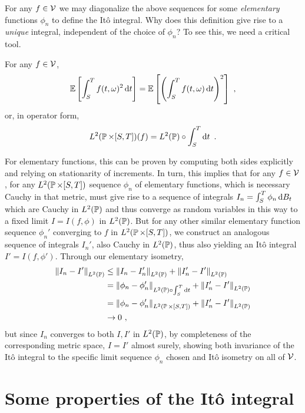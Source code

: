 \documentclass{article}
\begin{document}
For any \(f\in\mcV\) we may diagonalize the above sequences for some {\em elementary} functions \(\phi_n\) to define the It\^{o} integral. Why does this definition give rise to a {\em unique} integral, independent of the choice of \(\phi_n\)? To see this, we need a critical tool.

\begin{lemma}[It\^{o} Isometry]
  For any \(f\in \mcV\),
  \[
    \E\ha{\int_S^Tf(t, \omega)^2\d{t}}
    = \E\ha{\pa{\int_S^Tf(t, \omega)\d{t}}^2}\,\,,
  \]
  or, in operator form,
  \[L^2(\P \times [S, T])(f)=L^2(\P)\circ \int_S^T\d{t}\,\,.\]
\end{lemma}

For elementary functions, this can be proven by computing both sides explicitly and relying on stationarity of increments. In turn, this implies that for any \(f\in\mcV\), for any \(L^2(\P \times [S,T])\) sequence \(\phi_n\) of elementary functions, which is necessary Cauchy in that metric, must give rise to a sequence of integrals \(I_n=\int_S^T\phi_n\d{B_t}\) which are Cauchy in \(L^2(\P)\) and thus converge as random variables in this way to a fixed limit \(I = I(f, \phi)\) in \(L^2(\P)\). But for any other similar elementary function sequence \(\phi_n'\) converging to \(f\) in \(L^2(\P \times [S,T])\), we construct an analogous sequence of integrals \(I_n'\), also Cauchy in \(L^2(\P)\), thus also yielding an It\^{o} integral \(I'=I(f, \phi')\). Through our elementary isometry,
\begin{align*}
  \norm{I_n-I'}_{L^2(\P)}&\le\norm{I_n-I_n'}_{L^2(\P)}+\norm{I_n'-I'}_{L^2(\P)}\\
                         &=\norm{\phi_n-\phi_n'}_{L^2(\P)\circ\int_S^T\d{t}}+\norm{I_n'-I'}_{L^2(\P)}\\
                         &=\norm{\phi_n-\phi_n'}_{L^2(\P\times[S,T])}+\norm{I_n'-I'}_{L^2(\P)}\\
                           &\rightarrow 0\,\,,
\end{align*}
but since \(I_n\) converges to both \(I,I'\) in \(L^2(\P)\), by completeness of the corresponding metric space, \(I=I'\) almost surely, showing both invariance of the It\^{o} integral to the specific limit sequence \(\phi_n\) chosen and It\^{o} isometry on all of \(\mcV\).

\section{Some properties of the It\^{o} integral}
\end{document}
